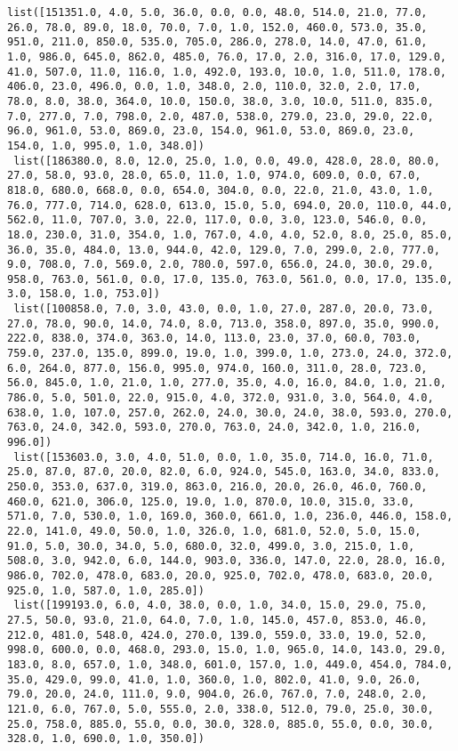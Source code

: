 \documentclass[11pt]{article}
\begin{document}
\begin{Verbatim}[commandchars=\\\{\}]
 list([151351.0, 4.0, 5.0, 36.0, 0.0, 0.0, 48.0, 514.0, 21.0, 77.0, 26.0, 78.0, 89.0, 18.0, 70.0, 7.0, 1.0, 152.0, 460.0, 573.0, 35.0, 951.0, 211.0, 850.0, 535.0, 705.0, 286.0, 278.0, 14.0, 47.0, 61.0, 1.0, 986.0, 645.0, 862.0, 485.0, 76.0, 17.0, 2.0, 316.0, 17.0, 129.0, 41.0, 507.0, 11.0, 116.0, 1.0, 492.0, 193.0, 10.0, 1.0, 511.0, 178.0, 406.0, 23.0, 496.0, 0.0, 1.0, 348.0, 2.0, 110.0, 32.0, 2.0, 17.0, 78.0, 8.0, 38.0, 364.0, 10.0, 150.0, 38.0, 3.0, 10.0, 511.0, 835.0, 7.0, 277.0, 7.0, 798.0, 2.0, 487.0, 538.0, 279.0, 23.0, 29.0, 22.0, 96.0, 961.0, 53.0, 869.0, 23.0, 154.0, 961.0, 53.0, 869.0, 23.0, 154.0, 1.0, 995.0, 1.0, 348.0])
 list([186380.0, 8.0, 12.0, 25.0, 1.0, 0.0, 49.0, 428.0, 28.0, 80.0, 27.0, 58.0, 93.0, 28.0, 65.0, 11.0, 1.0, 974.0, 609.0, 0.0, 67.0, 818.0, 680.0, 668.0, 0.0, 654.0, 304.0, 0.0, 22.0, 21.0, 43.0, 1.0, 76.0, 777.0, 714.0, 628.0, 613.0, 15.0, 5.0, 694.0, 20.0, 110.0, 44.0, 562.0, 11.0, 707.0, 3.0, 22.0, 117.0, 0.0, 3.0, 123.0, 546.0, 0.0, 18.0, 230.0, 31.0, 354.0, 1.0, 767.0, 4.0, 4.0, 52.0, 8.0, 25.0, 85.0, 36.0, 35.0, 484.0, 13.0, 944.0, 42.0, 129.0, 7.0, 299.0, 2.0, 777.0, 9.0, 708.0, 7.0, 569.0, 2.0, 780.0, 597.0, 656.0, 24.0, 30.0, 29.0, 958.0, 763.0, 561.0, 0.0, 17.0, 135.0, 763.0, 561.0, 0.0, 17.0, 135.0, 3.0, 158.0, 1.0, 753.0])
 list([100858.0, 7.0, 3.0, 43.0, 0.0, 1.0, 27.0, 287.0, 20.0, 73.0, 27.0, 78.0, 90.0, 14.0, 74.0, 8.0, 713.0, 358.0, 897.0, 35.0, 990.0, 222.0, 838.0, 374.0, 363.0, 14.0, 113.0, 23.0, 37.0, 60.0, 703.0, 759.0, 237.0, 135.0, 899.0, 19.0, 1.0, 399.0, 1.0, 273.0, 24.0, 372.0, 6.0, 264.0, 877.0, 156.0, 995.0, 974.0, 160.0, 311.0, 28.0, 723.0, 56.0, 845.0, 1.0, 21.0, 1.0, 277.0, 35.0, 4.0, 16.0, 84.0, 1.0, 21.0, 786.0, 5.0, 501.0, 22.0, 915.0, 4.0, 372.0, 931.0, 3.0, 564.0, 4.0, 638.0, 1.0, 107.0, 257.0, 262.0, 24.0, 30.0, 24.0, 38.0, 593.0, 270.0, 763.0, 24.0, 342.0, 593.0, 270.0, 763.0, 24.0, 342.0, 1.0, 216.0, 996.0])
 list([153603.0, 3.0, 4.0, 51.0, 0.0, 1.0, 35.0, 714.0, 16.0, 71.0, 25.0, 87.0, 87.0, 20.0, 82.0, 6.0, 924.0, 545.0, 163.0, 34.0, 833.0, 250.0, 353.0, 637.0, 319.0, 863.0, 216.0, 20.0, 26.0, 46.0, 760.0, 460.0, 621.0, 306.0, 125.0, 19.0, 1.0, 870.0, 10.0, 315.0, 33.0, 571.0, 7.0, 530.0, 1.0, 169.0, 360.0, 661.0, 1.0, 236.0, 446.0, 158.0, 22.0, 141.0, 49.0, 50.0, 1.0, 326.0, 1.0, 681.0, 52.0, 5.0, 15.0, 91.0, 5.0, 30.0, 34.0, 5.0, 680.0, 32.0, 499.0, 3.0, 215.0, 1.0, 508.0, 3.0, 942.0, 6.0, 144.0, 903.0, 336.0, 147.0, 22.0, 28.0, 16.0, 986.0, 702.0, 478.0, 683.0, 20.0, 925.0, 702.0, 478.0, 683.0, 20.0, 925.0, 1.0, 587.0, 1.0, 285.0])
 list([199193.0, 6.0, 4.0, 38.0, 0.0, 1.0, 34.0, 15.0, 29.0, 75.0, 27.5, 50.0, 93.0, 21.0, 64.0, 7.0, 1.0, 145.0, 457.0, 853.0, 46.0, 212.0, 481.0, 548.0, 424.0, 270.0, 139.0, 559.0, 33.0, 19.0, 52.0, 998.0, 600.0, 0.0, 468.0, 293.0, 15.0, 1.0, 965.0, 14.0, 143.0, 29.0, 183.0, 8.0, 657.0, 1.0, 348.0, 601.0, 157.0, 1.0, 449.0, 454.0, 784.0, 35.0, 429.0, 99.0, 41.0, 1.0, 360.0, 1.0, 802.0, 41.0, 9.0, 26.0, 79.0, 20.0, 24.0, 111.0, 9.0, 904.0, 26.0, 767.0, 7.0, 248.0, 2.0, 121.0, 6.0, 767.0, 5.0, 555.0, 2.0, 338.0, 512.0, 79.0, 25.0, 30.0, 25.0, 758.0, 885.0, 55.0, 0.0, 30.0, 328.0, 885.0, 55.0, 0.0, 30.0, 328.0, 1.0, 690.0, 1.0, 350.0])

\end{Verbatim}
\end{document}
